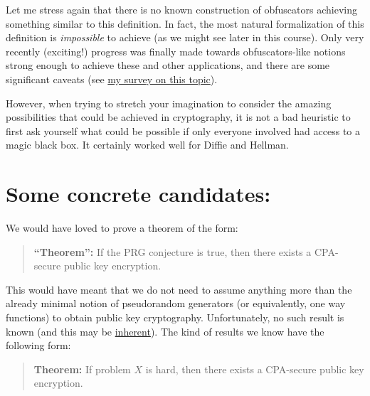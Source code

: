 Let me stress again that there is no known construction of obfuscators
achieving something similar to this definition. In fact, the most
natural formalization of this definition is \emph{impossible} to achieve
(as we might see later in this course). Only very recently (exciting!)
progress was finally made towards obfuscators-like notions strong enough
to achieve these and other applications, and there are some significant
caveats (see \href{https://eprint.iacr.org/2016/210}{my survey on this
topic}).

However, when trying to stretch your imagination to consider the amazing
possibilities that could be achieved in cryptography, it is not a bad
heuristic to first ask yourself what could be possible if only everyone
involved had access to a magic black box. It certainly worked well for
Diffie and Hellman.

\section{Some concrete candidates:}\label{10-Some-concrete-candidat}

We would have loved to prove a theorem of the form:

\begin{quote}
\textbf{``Theorem'':} If the PRG conjecture is true, then there exists a
CPA-secure public key encryption.
\end{quote}

This would have meant that we do not need to assume anything more than
the already minimal notion of pseudorandom generators (or equivalently,
one way functions) to obtain public key cryptography. Unfortunately, no
such result is known (and this may be
\href{https://www.cs.virginia.edu/~mohammad/files/papers/MerkleFull.pdf}{inherent}).
The kind of results we know have the following form:

\begin{quote}
\textbf{Theorem:} If problem \(X\) is hard, then there exists a
CPA-secure public key encryption.
\end{quote}

